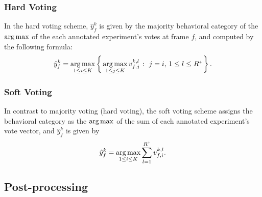 \subsubsection{Hard Voting}
In the hard voting scheme, $\hat{y}^k_f$ is given by the majority behavioral category of the $\operatorname*{arg\,max}$ of the each annotated experiment's votes at frame $f$, and computed by the following formula:
\begin{equation}
	\hat{y}^k_f = \argmax_{1 \leq i \leq K} \Set{\argmax_{1 \leq j \leq K} v_{f,j}^{k,l}}{j=i, \, 1 \leq l \leq \Ann{R}}.
\end{equation}

\subsubsection{Soft Voting}
In contrast to majority voting (hard voting), the soft voting scheme assigns the behavioral category as the $\operatorname*{arg\,max}$ of the sum of each annotated experiment's vote vector, and $\hat{y}^k_f$ is given by
\begin{equation}
	\hat{y}^k_f = \argmax_{1 \leq i \leq K} \sum_{l=1}^{\Ann{R}} v_{f,i}^{k,l}.
\end{equation}

\subsection{Post-processing}\label{section:postprocessing-predictions}

